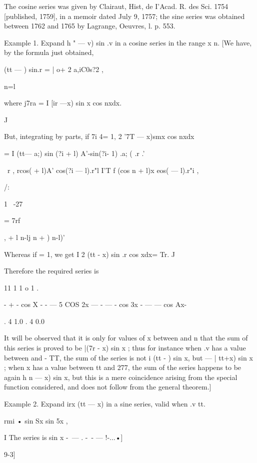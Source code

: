 The cosine series was given by Clairaut, Hist, de I'Acad. R. des Sci. 1754 [published, 
1759], in a memoir dated July 9, 1757; the sine series was obtained between 1762 and 
1765 by Lagrange, Oeuvres, l. p. 553. 

Example 1. Expand h   "  —  v) sin .v in a cosine series in the range  x n. 
[We have, by the formula just obtained, 

  (tt —  ) sin.r = | o+ 2 a,iC0s?2 , 

n=l 

where  j7ra = I   [ir —x) sin x cos nxdx. 

J 

But, integrating by parts, if 7i 4= 1, 
2 '7T — x)smx cos nxdx 

= I (tt— a;)  sin (?i + l) A'-sin(?i- 1) .a;  ( .r 
.' 

\ r , rcos(  + l)A' cos(?i — l).r"l I'T f  (cos n + l)x eos(  — l).r"i , 



/: 



1 \ -27 

= 7rf 



,  + l n-lj  n +  )  n-l)' 

Whereas if   = 1, we get I 2 (tt - x) sin .r cos xdx= Tr. 
J 

Therefore the required series is 

11 1   1 o 1 . 

- + - cos X - - — 5 COS 2x — - — - cos 3x - — — cos Ax- 

.   4 1.0   . 4 0.0 

It will be observed that it is only for values of x between and n that the sum of this 
series is proved to be |(7r - x) sin x ; thus for instance when .v has a value between and 
- TT, the sum of the series is not i (tt -  ) sin x, but — |  tt+x) sin x ; when x has a value 
between tt and 277, the sum of the series happens to be again h  n — x) sin x, but this is a 
mere coincidence arising from the special function considered, and does not follow from 
the general theorem.] 

Example 2. Expand  irx (tt — x) in a sine series, valid when  .v tt. 

rmi • sin Sx sin 5x , 

I The series is sin x -\ —  . -\ -  — !-...•] 



9-3] 



